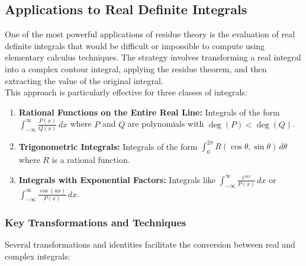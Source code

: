 \subsection*{Applications to Real Definite Integrals} 

\noindent One of the most powerful applications of residue theory is the evaluation of real definite integrals that would be difficult or impossible to compute using elementary calculus techniques. The strategy involves transforming a real integral into a complex contour integral, applying the residue theorem, and then extracting the value of the original integral. \\

\noindent This approach is particularly effective for three classes of integrals:

\begin{enumerate}
    \item \textbf{Rational Functions on the Entire Real Line:} Integrals of the form $\int_{-\infty}^{\infty} \frac{P(x)}{Q(x)} \, dx$ where $P$ and $Q$ are polynomials with $\deg(P) < \deg(Q)$.
    
    \item \textbf{Trigonometric Integrals:} Integrals of the form $\int_{0}^{2\pi} R(\cos \theta, \sin \theta) \, d\theta$ where $R$ is a rational function.
    
    \item \textbf{Integrals with Exponential Factors:} Integrals like $\int_{-\infty}^{\infty} \frac{e^{iax}}{P(x)} \, dx$ or $\int_{-\infty}^{\infty} \frac{\cos(ax)}{P(x)} \, dx$.
\end{enumerate}

\subsubsection*{Key Transformations and Techniques}

\noindent Several transformations and identities facilitate the conversion between real and complex integrals:

